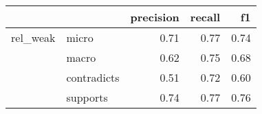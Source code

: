 \begin{tabular}{llrrr}
\toprule
         &          &  precision &  recall &   f1 \\
\midrule
rel\_weak & micro &       0.71 &    0.77 & 0.74 \\
         & macro &       0.62 &    0.75 & 0.68 \\
         & contradicts &       0.51 &    0.72 & 0.60 \\
         & supports &       0.74 &    0.77 & 0.76 \\
\bottomrule
\end{tabular}
